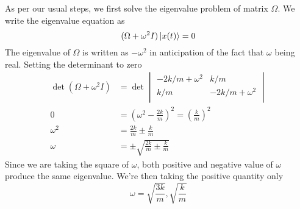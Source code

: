 \documentclass[../../../main.tex]{subfiles}
\begin{document}
As per our usual steps, we first solve the eigenvalue problem of matrix $\Omega$.
We write the eigenvalue equation as
\begin{equation*}
	(\Omega+\omega^2I)\ket{x(t)}=0
\end{equation*}
The eigenvalue of $\Omega$ is written as $-\omega^2$ in anticipation of the fact that $\omega$ being real.
Setting the determinant to zero
\begin{align*}
	\det (\Omega+\omega^2 I) & =\det
	\begin{vmatrix}
		-2k/m+\omega^2 & k/m            \\
		k/m            & -2k/m+\omega^2 \\
	\end{vmatrix}                                                                 \\
	0                        & =\left(\omega^2-\frac{2k }{m }\right)^2=\left(\frac{k }{m }\right)^2 \\
	\omega^2                 & =\frac{2k }{m }\pm \frac{k }{m}                                      \\
	\omega                   & =\pm \sqrt{\frac{2k }{m }\pm \frac{k }{m }}
\end{align*}
Since we are taking the square of $\omega$, both positive and negative value of $\omega$ produce the same eigenvalue.
We're then taking the positive quantity only
\begin{equation*}
	\omega=\sqrt{\frac{3k}{m }},\sqrt{\frac{k }{m}}
\end{equation*}
\end{document}
